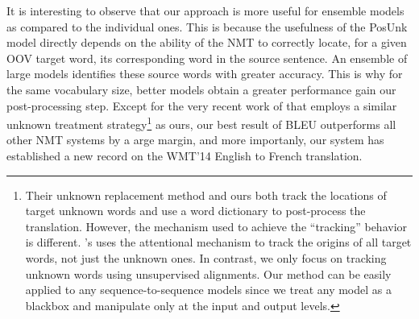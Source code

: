It is interesting to observe that our approach is more useful for ensemble models as compared to the individual ones. 
This is because the usefulness of the PosUnk model directly
depends on the ability of the NMT to correctly locate, for a given OOV target word, its corresponding word in the source sentence.  An ensemble of large models identifies these source words with greater accuracy.  This is why for the same vocabulary size, better models obtain a greater performance gain our post-processing step. 
Except for the very recent work of  that employs a similar unknown treatment strategy\footnote{Their unknown replacement method and ours both track the locations of target unknown words and use a word dictionary to post-process the translation. However, the mechanism used to achieve the ``tracking'' behavior is different. 's uses the attentional mechanism to track the origins of all target words, not just the unknown ones. In contrast, we only focus on tracking unknown words using unsupervised alignments. Our method can be easily applied to any sequence-to-sequence models since we treat any model as a blackbox and manipulate only at the input and output levels.} as ours, our best result of \bestbleuunk{} BLEU outperforms all other NMT systems by a 
arge margin, and 
more importanly, our system has established a new record on the WMT'14 English to French translation.

